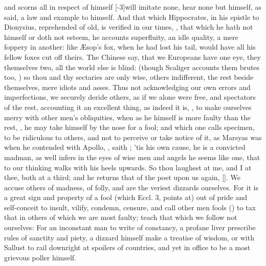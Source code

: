 {\etc{} and scorns all in respect of himself [-3\baselineskip]will imitate none, hear
none but himself, as \Pliny{} said, a law and example to himself. And
that which Hippocrates, in his epistle to Dionysius, reprehended of
old, is verified in our times, , that which he hath not himself or doth
not esteem, he accounts superfluity, an idle quality, a mere foppery in
another: like \AE{}sop's fox, when he had lost his tail, would have all
his fellow foxes cut off theirs. The Chinese say, that we Europeans
have one eye, they themselves two, all the world else is blind: (though
Scaliger accounts them brutes too, ) so thou and thy
sectaries are only wise, others indifferent, the rest beside
themselves, mere idiots and asses. Thus not acknowledging our own
errors and imperfections, we securely deride others, as if we alone
were free, and spectators of the rest, accounting it an excellent
thing, as indeed it is, , to make ourselves
merry with other men's obliquities, when as he himself is more faulty
than the rest, , he may take
himself by the nose for a fool; and which one calls 
specimen, to be ridiculous to others, and not to perceive or take
notice of it, as Marsyas was when he contended with Apollo, , saith \Apuleius{}; 'tis his own
cause, he is a convicted madman, as \Austin{} well infers in the eyes
of wise men and angels he seems like one, that to our thinking walks
with his heels upwards. So thou laughest at me, and I at thee, both at
a third; and he returns that of the poet upon us again, [\baselineskip]. We accuse others of
madness, of folly, and are the veriest dizzards ourselves. For it is a
great sign and property of a fool (which Eccl.  3, points at) out of
pride and self-conceit to insult, vilify, condemn, censure, and call
other men fools () to tax that in
others of which we are most faulty; teach that which we follow not
ourselves: For an inconstant man to write of constancy, a profane liver
prescribe rules of sanctity and piety, a dizzard himself make a
treatise of wisdom, or with Sallust to rail downright at spoilers of
countries, and yet in office to be a most grievous poller himself.

}
